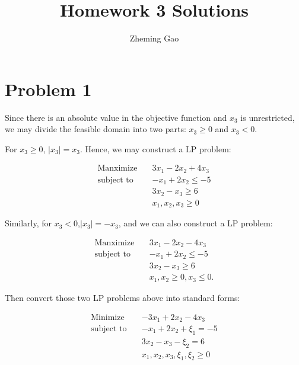 \documentclass[12pt]{article}
\begin{document}
 
 
\title{Homework 3 Solutions}
\author{Zheming Gao}
\maketitle


\section*{Problem 1}

Since there is an absolute value in the objective function and $x_3$ is unrestricted, we may divide the feasible domain into two parts: $x_3 \geqslant 0$ and $x_3 < 0$.

For $x_3 \geqslant 0$, $|x_3| = x_3$. Hence, we may construct a LP problem:

\begin{equation*}
\begin{aligned}
\text{Manximize} \quad & 3x_1 - 2x_2 + 4 x_3 \\
\text{subject\  to} \quad & -x_1 + 2 x_2 \leqslant -5 \\
& 3 x_2 - x_3 \geqslant 6 \\
& x_1, x_2, x_3 \geqslant 0
\end{aligned}
\end{equation*}

Similarly, for $x_3 < 0$,$|x_3| = -x_3$, and we can also construct a LP problem:

\begin{equation*}
\begin{aligned}
\text{Manximize} \quad & 3x_1 - 2x_2 - 4 x_3 \\
\text{subject\  to} \quad & -x_1 + 2 x_2 \leqslant -5 \\
& 3 x_2 - x_3 \geqslant 6 \\
& x_1, x_2 \geqslant 0, x_3 \leqslant 0.
\end{aligned}
\end{equation*}

Then convert those two LP problems above into standard forms:

\begin{equation}\label{L1}
\begin{aligned}
\text{Minimize} \quad & -3x_1 + 2x_2 - 4 x_3 \\
\text{subject\  to} \quad & -x_1 + 2 x_2 + \xi_1 = -5 \\
& 3 x_2 - x_3 - \xi_2 = 6 \\
& x_1, x_2, x_3, \xi_1, \xi_2 \geqslant 0
\end{aligned}
\end{equation}
\end{document}
